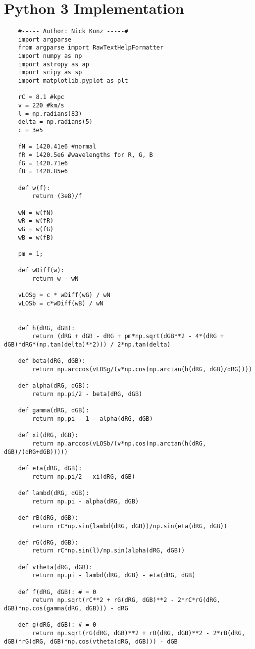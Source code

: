 \documentclass[12pt]{article}
\begin{document}
	\section{Python 3 Implementation}
	\begin{lstlisting}
	#----- Author: Nick Konz -----#
	import argparse
	from argparse import RawTextHelpFormatter
	import numpy as np
	import astropy as ap
	import scipy as sp
	import matplotlib.pyplot as plt
	
	rC = 8.1 #kpc
	v = 220 #km/s
	l = np.radians(83)
	delta = np.radians(5)
	c = 3e5
	
	fN = 1420.41e6 #normal
	fR = 1420.5e6 #wavelengths for R, G, B
	fG = 1420.71e6
	fB = 1420.85e6
	
	def w(f):
		return (3e8)/f
	
	wN = w(fN)
	wR = w(fR)
	wG = w(fG)
	wB = w(fB)
	
	pm = 1;
	
	def wDiff(w):
		return w - wN
	
	vLOSg = c * wDiff(wG) / wN
	vLOSb = c*wDiff(wB) / wN
	
	
	def h(dRG, dGB):
		return (dRG + dGB - dRG + pm*np.sqrt(dGB**2 - 4*(dRG + dGB)*dRG*(np.tan(delta)**2))) / 2*np.tan(delta)
	
	def beta(dRG, dGB):
		return np.arccos(vLOSg/(v*np.cos(np.arctan(h(dRG, dGB)/dRG))))
	
	def alpha(dRG, dGB):
		return np.pi/2 - beta(dRG, dGB)
	
	def gamma(dRG, dGB):
		return np.pi - 1 - alpha(dRG, dGB)
	
	def xi(dRG, dGB):
		return np.arccos(vLOSb/(v*np.cos(np.arctan(h(dRG, dGB)/(dRG+dGB)))))
	
	def eta(dRG, dGB):
		return np.pi/2 - xi(dRG, dGB)
	
	def lambd(dRG, dGB):
		return np.pi - alpha(dRG, dGB)
	
	def rB(dRG, dGB):
		return rC*np.sin(lambd(dRG, dGB))/np.sin(eta(dRG, dGB))
	
	def rG(dRG, dGB):
		return rC*np.sin(l)/np.sin(alpha(dRG, dGB))
	
	def vtheta(dRG, dGB):
		return np.pi - lambd(dRG, dGB) - eta(dRG, dGB)
	
	def f(dRG, dGB): # = 0
		return np.sqrt(rC**2 + rG(dRG, dGB)**2 - 2*rC*rG(dRG, dGB)*np.cos(gamma(dRG, dGB))) - dRG
	
	def g(dRG, dGB): # = 0
		return np.sqrt(rG(dRG, dGB)**2 + rB(dRG, dGB)**2 - 2*rB(dRG, dGB)*rG(dRG, dGB)*np.cos(vtheta(dRG, dGB))) - dGB
		

\end{lstlisting}
\end{document}
